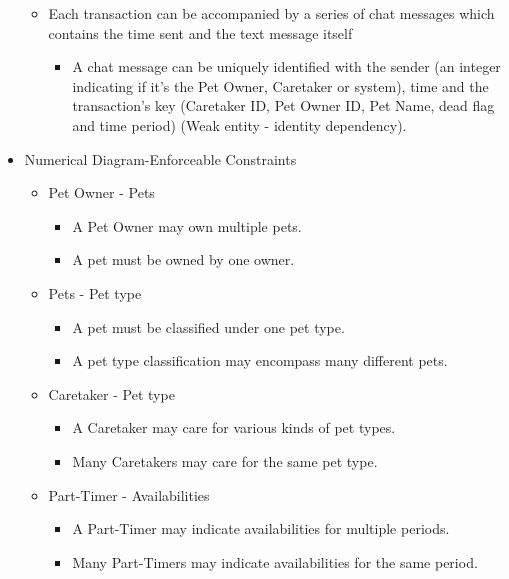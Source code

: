\documentclass[10pt]{article}
\begin{document}
\begin{itemize}
\begin{itemize}
\begin{itemize}
        \end{itemize}
        \item Each transaction can be accompanied by a series of chat messages which contains the time sent and the text message itself
        \begin{itemize}
            \item A chat message can be uniquely identified with the sender (an integer indicating if it's the Pet Owner, Caretaker or system), time and the transaction's key (Caretaker ID, Pet Owner ID, Pet Name, dead flag and time period) (Weak entity - identity dependency).
        \end{itemize}
    \end{itemize}
    
    \item Numerical Diagram-Enforceable Constraints
    \begin{itemize}
        \item Pet Owner - Pets
        \begin{itemize}
            \item A Pet Owner may own multiple pets.
            \item A pet must be owned by one owner.
        \end{itemize}
        \item Pets - Pet type
        \begin{itemize}
            \item A pet must be classified under one pet type.
            \item A pet type classification may encompass many different pets.
        \end{itemize}
        \item Caretaker - Pet type
        \begin{itemize}
            \item A Caretaker may care for various kinds of pet types.
            \item Many Caretakers may care for the same pet type.
        \end{itemize}
        \item Part-Timer - Availabilities
        \begin{itemize}
            \item A Part-Timer may indicate availabilities for multiple periods.
            \item Many Part-Timers may indicate availabilities for the same period.
	    \end{itemize}

\end{itemize}
\end{itemize}
\end{document}
